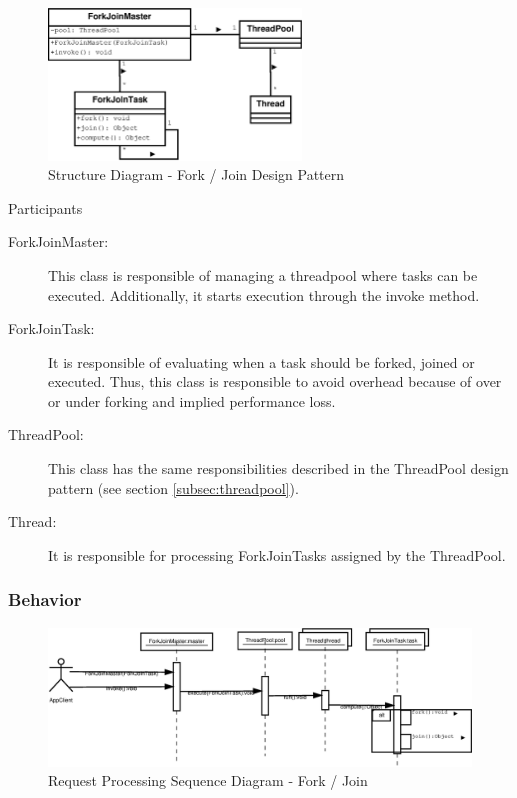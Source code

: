\begin{figure}
	\centering
	\includegraphics*[width=0.6\textwidth, keepaspectratio=false]{fig/image10.eps}
	\caption{Structure Diagram - Fork / Join Design Pattern}
	\label{fig:str_diagram_fk}
\end{figure}

\begin{description}
	\item[Participants]
\end{description}

\begin{description}
	\item [ForkJoinMaster:]
	This class is responsible of managing a threadpool where tasks can be executed. Additionally, it starts execution through the invoke method.
	
	\item [ForkJoinTask:]
	It is responsible of evaluating when a task should be forked, joined or executed. Thus, this class is responsible to avoid overhead because of over or under forking and implied performance loss.
	
	\item [ThreadPool:]
	This class has the same responsibilities described in the ThreadPool design pattern (see section \ref{subsec:threadpool}).
	
	\item [Thread:]
	It is responsible for processing ForkJoinTasks assigned by the ThreadPool.
	
\end{description}

\subsubsection{Behavior}

\begin{figure}
	\centering
	\includegraphics*[width=1\textwidth, keepaspectratio=false]{fig/image11.eps}
	\caption{Request Processing Sequence Diagram - Fork / Join}
	\label{fig:seq_diagram_fk}
\end{figure}

